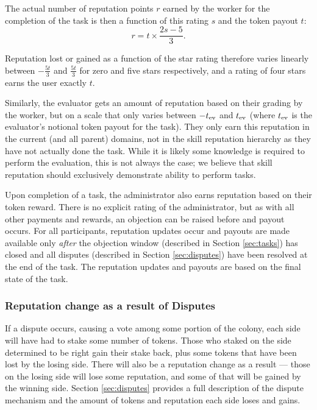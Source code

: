 The actual number of reputation points $r$ earned by the worker for the completion of the task is then a function of this rating $s$ and the token payout $t$:
\begin{equation*}\label{eq:stars-to-rep}
 r = t \times \frac{2s - 5}{3}.
\end{equation*}
 
Reputation lost or gained as a function of the star rating therefore varies linearly between $-\frac{5t}{3}$ and $\frac{5t}{3}$ for zero and five stars respectively, and a rating of four stars earns the user exactly $t$. 

Similarly, the evaluator gets an amount of reputation based on their grading by the worker, but on a scale that only varies between $-t_{\rm ev}$ and $t_{\rm ev}$ (where $t_{\rm ev}$ is the evaluator's notional token payout for the task). They only earn this reputation in the current (and all parent) domains, not in the skill reputation hierarchy as they have not actually done the task. While it is likely some knowledge is required to perform the evaluation, this is not always the case; we believe that skill reputation should exclusively demonstrate ability to perform tasks.

Upon completion of a task, the administrator also earns reputation based on their token reward. There is no explicit rating of the administrator, but as with all other payments and rewards, an objection can be raised before and payout occurs. For all participants, reputation updates occur and payouts are made available only \emph{after} the objection window (described in Section \ref{sec:tasks}) has closed and all disputes  (described in Section \ref{sec:disputes}) have been resolved at the end of the task. The reputation updates and payouts are based on the final state of the task.

\subsubsection{Reputation change as a result of Disputes}\label{sec:earning-rep-in-disputes}
If a dispute occurs, causing a vote among some portion of the colony, each side will have had to stake some number of tokens. Those who staked on the side determined to be right gain their stake back, plus some tokens that have been lost by the losing side. There will also be a reputation change as a result --- those on the losing side will lose some reputation, and some of that will be gained by the winning side. Section \ref{sec:disputes} provides a full description of the dispute mechanism and the amount of tokens and reputation each side loses and gains.


